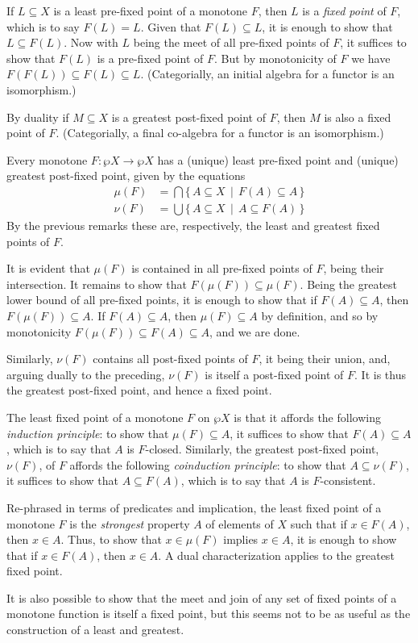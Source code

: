 \documentclass[11pt,twoside]{article}
\begin{document}
If $L\subseteq X$ is a least pre-fixed point of a monotone $F$, then $L$ is a \emph{fixed point}
of $F$, which is to say $F(L)=L$. Given that $F(L)\subseteq L$, it is enough to show that
$L\subseteq F(L)$. Now with $L$ being the meet of all pre-fixed points of $F$, it suffices to show
that $F(L)$ is a pre-fixed point of $F$. But by monotonicity of $F$ we have
$F(F(L))\subseteq F(L)\subseteq L$.  (Categorially, an initial algebra for a functor is an isomorphism.)

By duality if $M\subseteq X$ is a greatest post-fixed point of $F$, then $M$ is also a fixed point
of $F$. (Categorially, a final co-algebra for a functor is an isomorphism.)

Every monotone $F:\wp{X}\to\wp{X}$ has a (unique) least pre-fixed point and (unique) greatest
post-fixed point, given by the equations
\begin{align*}
  \mu(F) & = \bigcap\{\,A\subseteq X\,\mid\, F(A)\subseteq A\,\} \\
  \nu(F) & = \bigcup\{\,A\subseteq X\,\mid\,A\subseteq F(A)\,\}
\end{align*}
By the previous remarks these are, respectively, the least and greatest fixed
points of $F$.

It is evident that $\mu(F)$ is contained in all pre-fixed points of $F$, being
their intersection.  It remains to show that $F(\mu(F))\subseteq \mu(F)$.  Being the
greatest lower bound of all pre-fixed points, it is enough to show that if
$F(A)\subseteq A$, then $F(\mu(F))\subseteq A$.  If $F(A)\subseteq A$, then $\mu(F)\subseteq A$ by definition, and
so by monotonicity $F(\mu(F))\subseteq F(A)\subseteq A$, and we are done.

Similarly, $\nu(F)$ contains all post-fixed points of $F$, it being their union,
and, arguing dually to the preceding, $\nu(F)$ is itself a post-fixed point of
$F$.  It is thus the greatest post-fixed point, and hence a fixed point.

The least fixed point of a monotone $F$ on $\wp{X}$ is that it affords the following
\emph{induction principle}: to show that $\mu(F)\subseteq A$, it suffices to show that
$F(A)\subseteq A$, which is to say that $A$ is $F$-closed.  Similarly, the greatest post-fixed
point, $\nu(F)$, of $F$ affords the following \emph{coinduction principle}: to show that
$A\subseteq \nu(F)$, it suffices to show that $A\subseteq F(A)$, which is to say that $A$ is $F$-consistent.

Re-phrased in terms of predicates and implication, the least fixed point of a monotone $F$
is the \emph{strongest} property $A$ of elements of $X$ such that if $x\in F(A)$, then
$x\in A$.  Thus, to show that $x\in\mu(F)$ implies $x\in A$, it is enough to show that if
$x\in F(A)$, then $x\in A$.  A dual characterization applies to the greatest fixed point.

It is also possible to show that the meet and join of any set of fixed points of a
monotone function is itself a fixed point, but this seems not to be as useful as the
construction of a least and greatest.
\end{document}
